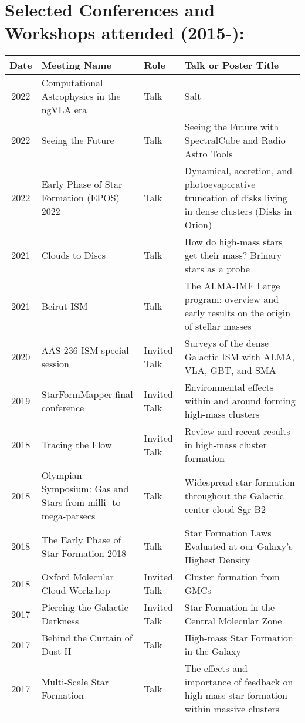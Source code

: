 \setlength{\extrarowheight}{4pt}
\section*{Selected Conferences and Workshops attended (2015-): }
\vspace{-12pt}
\begin{tabular}{cp{1.8in}p{1.5cm}p{3.0in}}
    Date & Meeting Name & Role & Talk or Poster Title \\
                \hline
    2022 &      Computational Astrophysics in the ngVLA era & Talk & Salt \\
    2022 &      Seeing the Future & Talk & Seeing the Future with SpectralCube and Radio Astro Tools \\
    2022 &      Early Phase of Star Formation (EPOS) 2022 & Talk &  Dynamical, accretion, and photoevaporative truncation of disks living in dense clusters (Disks in Orion)\\
    2021 &      Clouds to Discs & Talk & How do high-mass stars get their mass? Brinary stars as a probe \\
    2021 &      Beirut ISM & Talk & The ALMA-IMF Large program: overview and early results on the origin of stellar masses \\
    2020 &      AAS 236 ISM special session & Invited Talk &  Surveys of the dense Galactic ISM with ALMA, VLA, GBT, and SMA \\
    2019 &      StarFormMapper final conference & Invited Talk & Environmental effects within and around forming high-mass clusters \\
    2018 &      Tracing the Flow & Invited Talk & Review and recent results in high-mass cluster formation \\
    2018 &      Olympian Symposium: Gas and Stars from milli- to mega-parsecs & Talk & 	Widespread star formation throughout the Galactic center cloud Sgr B2 \\
    2018 &      The Early Phase of Star Formation 2018 & Talk & Star Formation Laws Evaluated at our Galaxy's Highest Density \\
    2018 &      Oxford Molecular Cloud Workshop & Invited Talk & Cluster formation from GMCs \\
    2017 &      Piercing the Galactic Darkness & Invited Talk & Star Formation in the Central Molecular Zone \\
    2017 &      Behind the Curtain of Dust II & Talk & High-mass Star Formation in the Galaxy \\
    2017 &      Multi-Scale Star Formation & Talk & The effects and importance of feedback on high-mass star formation within massive clusters \\

\end{tabular}
